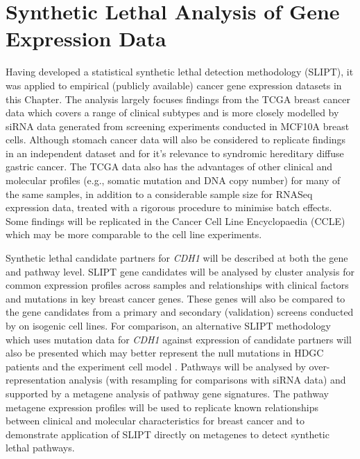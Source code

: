 \chapter{Synthetic Lethal Analysis of Gene Expression Data}
\label{chap:SLIPT}

Having developed a statistical synthetic lethal detection methodology (SLIPT), it was applied to empirical (publicly available) cancer gene expression datasets in this Chapter. The analysis largely focuses findings from the TCGA breast cancer data \citep{TCGA2012} which covers a range of clinical subtypes and is more closely modelled by siRNA data \citep{Telford2015} generated from screening experiments conducted in MCF10A breast cells. Although stomach cancer data will also be considered to replicate findings in an independent dataset and for it's relevance to syndromic hereditary diffuse gastric cancer. The TCGA data also has the advantages of other clinical and molecular profiles (e.g., somatic mutation and DNA copy number) for many of the same samples, in addition to a considerable sample size for RNASeq expression data, treated with a rigorous procedure to minimise batch effects. Some findings will be replicated in the Cancer Cell Line Encyclopaedia (CCLE) \citep{Barretina2012} which may be more comparable to the cell line experiments.

Synthetic lethal candidate partners for \textit{CDH1} will be described at both the gene and pathway level. SLIPT gene candidates will be analysed by cluster analysis for common expression profiles across samples and relationships with clinical factors and mutations in key breast cancer genes. These genes will also be compared to the gene candidates from a primary and secondary (validation) screens conducted by \citet{Telford2015} on isogenic cell lines. For comparison, an alternative SLIPT methodology which uses mutation data for \textit{CDH1} against expression of candidate partners will also be presented which may better represent the null mutations in HDGC patients and the experiment cell model \citep{Chen2014}. Pathways will be analysed by over-representation analysis (with resampling for comparisons with siRNA data) and supported by a metagene analysis of pathway gene signatures. The pathway metagene expression profiles will be used to replicate known relationships between clinical and molecular characteristics for breast cancer and to demonstrate application of SLIPT directly on metagenes to detect synthetic lethal pathways.

